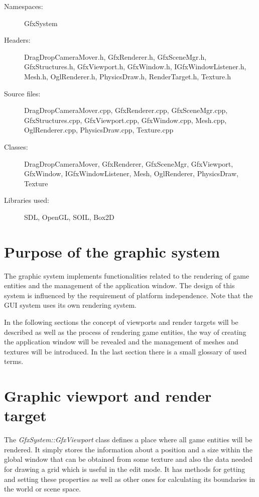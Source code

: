 \begin{description}
  \item[Namespaces:] GfxSystem
  \item[Headers:] DragDropCameraMover.h, GfxRenderer.h, GfxSceneMgr.h, Gfx\-Structures.\-h, GfxViewport.h, GfxWindow.h, IGfxWindowListener.h, Mesh.h, OglRenderer.h, PhysicsDraw.h, RenderTarget.h, Texture.h
  \item[Source files:] DragDropCameraMover.cpp, GfxRenderer.cpp, Gfx\-Scene\-Mgr.\-cpp, GfxStructures.cpp, GfxViewport.cpp, GfxWindow.cpp, Mesh.cpp, OglRenderer.cpp, PhysicsDraw.cpp, Texture.cpp
  \item[Classes:] DragDropCameraMover, GfxRenderer, GfxSceneMgr, Gfx\-Viewport, GfxWindow, IGfxWindowListener, Mesh,  OglRenderer, PhysicsDraw, Texture
  \item[Libraries used:] SDL, OpenGL, SOIL, Box2D
\end{description}

\section{Purpose of the graphic system}

The graphic system implements functionalities related to the rendering of game entities and the management of the application window. The design of this system is influenced by the requirement of platform independence. Note that the GUI system uses its own rendering system.

In the following sections the concept of viewports and render targets will be described as well as the process of rendering game entities, the way of creating the application window will be revealed and the management of meshes and textures will be introduced. In the last section there is a small glossary of used terms.

\section{Graphic viewport and render target}

The \emph{GfxSystem::GfxViewport} class defines a place where all game entities will be rendered. It simply stores the information about a position and a size within the global window that can be obtained from some texture and also the data needed for drawing a grid which is useful in the edit mode. It has methods for getting and setting these properties as well as other ones for calculating its boundaries in the world or scene space.

